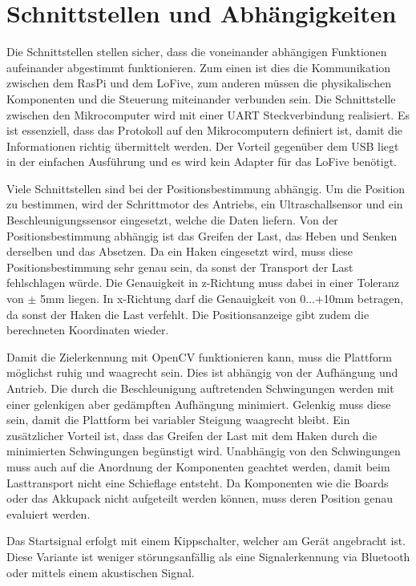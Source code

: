 \documentclass[a4paper]{report}
\begin{document}
\section{Schnittstellen und Abhängigkeiten}
\label{sec:SchnittAbhang}
Die Schnittstellen stellen sicher, dass die voneinander abhängigen Funktionen aufeinander abgestimmt funktionieren. Zum einen ist dies die Kommunikation zwischen dem RasPi und dem LoFive, zum anderen müssen die physikalischen Komponenten und die Steuerung miteinander verbunden sein. Die Schnittstelle zwischen den Mikrocomputer wird mit einer UART Steckverbindung realisiert. Es ist essenziell, dass das Protokoll auf den Mikrocomputern definiert ist, damit die Informationen richtig übermittelt werden. Der Vorteil gegenüber dem USB liegt in der einfachen Ausführung und es wird kein Adapter für das LoFive benötigt.

Viele Schnittstellen sind bei der Positionsbestimmung abhängig. Um die Position zu bestimmen, wird der Schrittmotor des Antriebs, ein Ultraschallsensor und ein Beschleunigungssensor eingesetzt, welche die Daten liefern. Von der Positionsbestimmung abhängig ist das Greifen der Last, das Heben und Senken derselben und das Absetzen. Da ein Haken eingesetzt wird, muss diese Positionsbestimmung sehr genau sein, da sonst der Transport der Last fehlschlagen würde. Die Genauigkeit in z-Richtung muss dabei in einer Toleranz von $\pm$ 5mm liegen. In x-Richtung darf die Genauigkeit von 0...+10mm betragen, da sonst der Haken die Last verfehlt. Die Positionsanzeige gibt zudem die berechneten Koordinaten wieder.

Damit die Zielerkennung mit OpenCV funktionieren kann, muss die Plattform möglichst ruhig und waagrecht sein. Dies ist abhängig von der Aufhängung und Antrieb. Die durch die Beschleunigung auftretenden Schwingungen werden mit einer gelenkigen aber gedämpften Aufhängung minimiert. Gelenkig muss diese sein, damit die Plattform bei variabler Steigung waagrecht bleibt. Ein zusätzlicher Vorteil ist, dass das Greifen der Last mit dem Haken durch die minimierten Schwingungen begünstigt wird. Unabhängig von den Schwingungen muss auch auf die Anordnung der Komponenten geachtet werden, damit beim Lasttransport nicht eine Schieflage entsteht. Da Komponenten wie die Boards oder das Akkupack nicht aufgeteilt werden können, muss deren Position genau evaluiert werden.

Das Startsignal erfolgt mit einem Kippschalter, welcher am Gerät angebracht ist. Diese Variante ist weniger störungsanfällig als eine Signalerkennung via Bluetooth oder mittels einem akustischen Signal.
\end{document}
